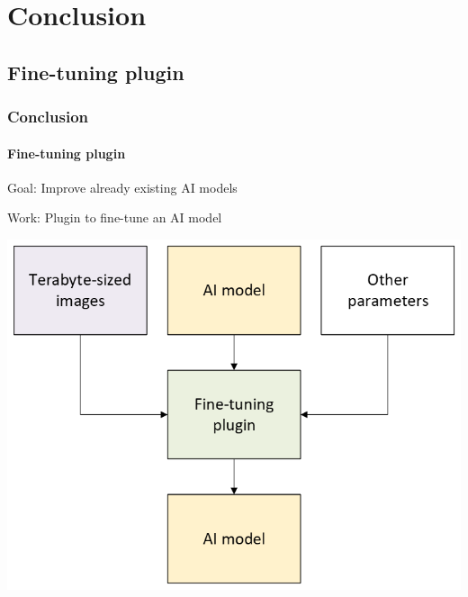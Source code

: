 \def\sectiontitle{Conclusion}

\section{\sectiontitle}

\def\slidetitle{Fine-tuning plugin}

\subsection{\slidetitle}
\begin{frame}
  \frametitle{\sectiontitle}
  \framesubtitle{\slidetitle}

  \begin{minipage}[h!]{0.53\textwidth}
    Goal: Improve already existing AI models

    \bigskip

    Work: Plugin to fine-tune an AI model
  \end{minipage}\hfill
  \begin{minipage}[h!]{0.46\textwidth}
    \includegraphics[scale=0.55]{./img/5_conclusion.png}
  \end{minipage}
\end{frame}